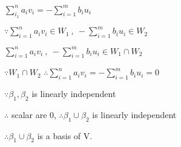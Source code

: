 \begin{tcolorbox}
\begin{solution}
		$\sum^n_{i_1}a_iv_i = -\sum^m_{i=1}b_iu_i$
		
		$\because \sum^n_{i=1}a_iv_i \in W_1~,~ -\sum^m_{i=1}b_iu_i \in W_2$
		
		$\sum^n_{i=1}a_iv_i~,~-\sum^m_{i=1}b_iu_i \in W_1 \cap W_2$
		
		$\because W_1 \cap W_2$ $\therefore \sum^n_{i=1}a_iv_i = -\sum^m_{i=1}b_iu_i = 0$
		
		$\because \beta_1 , \beta_2$ is linearly independent
		
		$\therefore$ scalar are 0, $\therefore \beta_1 \cup \beta_2$ is linearly independent
		
		$\therefore \beta_1 \cup \beta_2$ is a basis of V.
		
	\end{solution}
\end{tcolorbox}